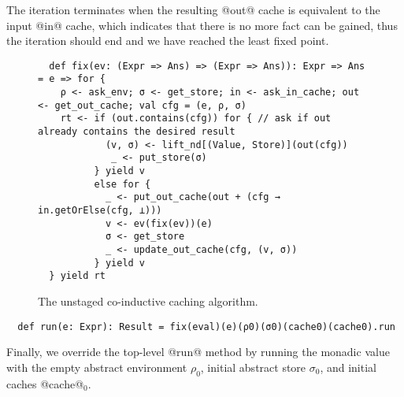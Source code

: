 The iteration terminates when the resulting @out@ cache is equivalent to the
input @in@ cache, which indicates that there is no more fact can be gained, thus
the iteration should end and we have reached the least fixed point.

\begin{figure}[h!]
  \centering
\begin{lstlisting}
  def fix(ev: (Expr => Ans) => (Expr => Ans)): Expr => Ans = e => for {
    ρ <- ask_env; σ <- get_store; in <- ask_in_cache; out <- get_out_cache; val cfg = (e, ρ, σ)
    rt <- if (out.contains(cfg)) for { // ask if out already contains the desired result
            (v, σ) <- lift_nd[(Value, Store)](out(cfg))
             _ <- put_store(σ)
          } yield v
          else for {
            _ <- put_out_cache(out + (cfg → in.getOrElse(cfg, ⊥)))
            v <- ev(fix(ev))(e)
            σ <- get_store
            _ <- update_out_cache(cfg, (v, σ))
          } yield v
  } yield rt
\end{lstlisting}
\vspace{-1em}
\caption{The unstaged co-inductive caching algorithm.}
\label{fig:coind_cache}
\end{figure}

\begin{lstlisting}
  def run(e: Expr): Result = fix(eval)(e)(ρ0)(σ0)(cache0)(cache0).run
\end{lstlisting}

Finally, we override the top-level @run@ method by running the monadic value
with the empty abstract environment $\rho_0$, initial abstract store $\sigma_0$,
and initial caches @cache@$_0$.
